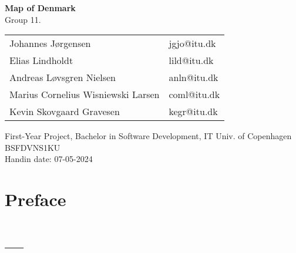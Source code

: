\documentclass[a4paper,12pt]{article}
\begin{document}
\begin{center}
    \huge{\textbf{Map of Denmark}}\\
    \Large{Group 11.}\\
  \end{center}
    \begin{center}
      \begin{tabular}{p{2.85in}|p{2.85in}}
         Johannes Jørgensen & jgjo@itu.dk  \\   
         Elias Lindholdt & lild@itu.dk  \\
         Andreas Løvsgren Nielsen & anln@itu.dk\\
         Marius Cornelius Wisniewski Larsen & coml@itu.dk \\
         Kevin Skovgaard Gravesen & kegr@itu.dk \\    
         \hline
      \end{tabular}
   \end{center}
   \vspace{0.5cm}
  \begin{center}
    \vspace{0.5cm}
    First-Year Project, Bachelor in Software Development, IT Univ. of Copenhagen\\
    BSFDVNS1KU\\
    \vspace{0.5cm}
    Handin date: 07-05-2024  
  \end{center}

\newpage
\pagestyle{fancy}
\fancyhead{} %
\fancyfoot{} %
\fancyfoot[LE,RO]{\thepage}
\renewcommand*\contentsname{Table of Contents}
\tableofcontents
\newpage


\section{Preface}
\section{---}
\end{document}
